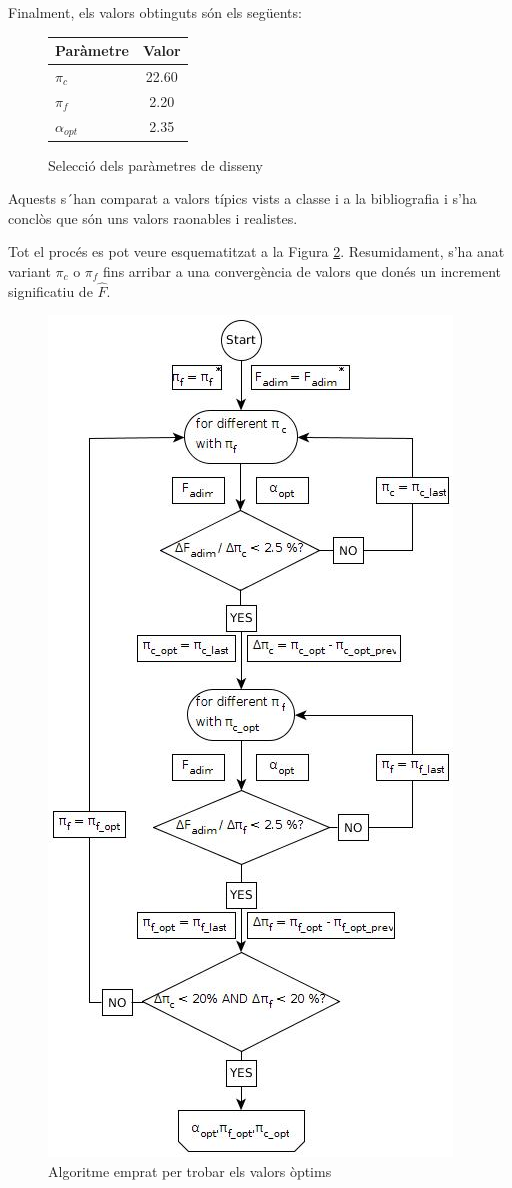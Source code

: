 Finalment, els valors obtinguts són els següents:
\begin{figure}[H]
	\centering
	\begin{tabular}{lc}
		\toprule[3pt]
		\textbf{Paràmetre}&\textbf{Valor}\\
		\midrule[1pt]
		$\pi_{c}$ & 22.60 \\
		$\pi_{f}$ & 2.20 \\
		$\alpha_{opt}$ & 2.35 \\
		\bottomrule[2pt]
	\end{tabular}
	\label{C_opti2}
	\caption{Selecció dels paràmetres de disseny}
\end{figure}
Aquests s´han comparat a valors típics vists a classe i a la bibliografia i s'ha conclòs que són uns valors raonables i realistes.

Tot el procés es pot veure esquematitzat a la Figura \ref{opt}. Resumidament, s'ha anat variant $\pi_c$ o $\pi_f$ fins arribar a una convergència de valors que donés un increment significatiu de $\hat{F}$. 
\begin{figure}[H]
	\centering
	\includegraphics[scale=0.6]{./pics/optimization}
	\caption{Algoritme emprat per trobar els valors òptims}
	\label{opt}
\end{figure}
